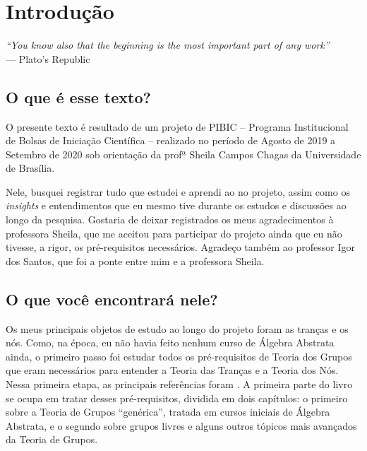\chapter*{Introdução}
%
\hfill%
\begin{minipage}{10cm}
\begin{flushright}
\rightskip=0.5cm
\textit{``You know also that the beginning is the most important part of any work''}
\\[0.1cm]
\rightskip=0.5cm
--- Plato's Republic
\end{flushright}
\end{minipage}

\section*{O que é esse texto?}

    \par O presente texto é resultado de um projeto de PIBIC -- 
    Programa Institucional de Bolsas de Iniciação Científica --
    realizado no período de Agosto de 2019 a Setembro de 2020
    sob orientação da profª Sheila Campos Chagas da Universidade
    de Brasília.
    
    \par\vspace{0.3cm} Nele, busquei registrar tudo que estudei e aprendi ao
    no projeto, assim como os {\it insights} e
    entendimentos que eu mesmo tive durante os estudos e 
    discussões ao longo da pesquisa. Gostaria de deixar registrados
    os meus agradecimentos à professora Sheila, que me aceitou para
    participar do projeto ainda que eu não tivesse, a rigor, os pré-requisitos
    necessários. Agradeço também ao professor Igor dos Santos, que foi a ponte
    entre mim e a professora Sheila.
    
\section*{O que você encontrará nele?}

    \par Os meus principais objetos de estudo ao longo do projeto
    foram as tranças e os nós. Como, na época, eu não havia feito
    nenhum curso de Álgebra Abstrata ainda, o primeiro passo foi estudar todos os 
    pré-requisitos de Teoria dos Grupos que eram necessários
    para entender a Teoria das Tranças e a Teoria dos Nós.
    Nessa primeira etapa, as principais referências foram
    \cite{Livro-do-Fraleigh, Gallian}. A primeira parte do
    livro se ocupa em tratar desses pré-requisitos, dividida
    em dois capítulos: o primeiro sobre a Teoria de Grupos
    ``genérica'', tratada em cursos iniciais de Álgebra Abstrata,
    e o segundo sobre grupos livres e alguns outros tópicos
    mais avançados da Teoria de Grupos.
    
